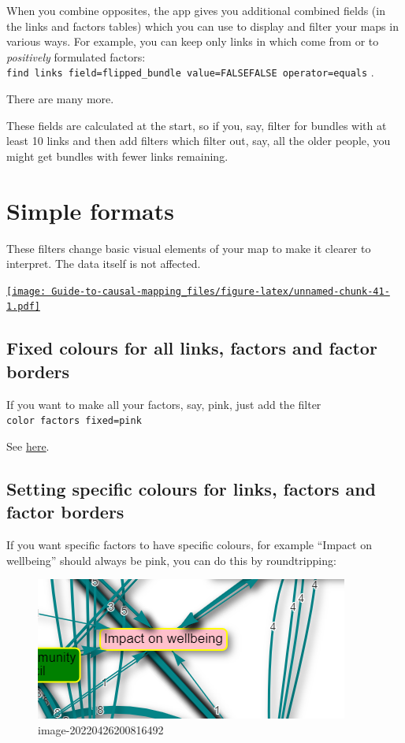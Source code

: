 \documentclass[
]{book}
\begin{document}
When you combine opposites, the app gives you additional combined fields (in the links and factors tables) which you can use to display and filter your maps in various ways. For example, you can keep only links in which come from or to \emph{positively} formulated factors: \texttt{find\ links\ field=flipped\_bundle\ value=FALSE\textbar{}FALSE\ operator=equals} .

There are many more.

These fields are calculated at the start, so if you, say, filter for bundles with at least 10 links and then add filters which filter out, say, all the older people, you might get bundles with fewer links remaining.

\hypertarget{xsimple-formats}{%
\chapter{Simple formats}\label{xsimple-formats}}

These filters change basic visual elements of your map to make it clearer to interpret. The data itself is not affected.

\href{https://player.vimeo.com/video/651173445}{\texttt{[image: Guide-to-causal-mapping\_files/figure-latex/unnamed-chunk-41-1.pdf]}}

\hypertarget{fixed-colours-for-all-links-factors-and-factor-borders}{%
\section{Fixed colours for all links, factors and factor borders}\label{fixed-colours-for-all-links-factors-and-factor-borders}}

If you want to make all your factors, say, pink, just add the filter \texttt{color\ factors\ fixed=pink}

See \protect\hyperlink{xfixed-colours}{here}.

\hypertarget{setting-specific-colours-for-links-factors-and-factor-borders}{%
\section{Setting specific colours for links, factors and factor borders}\label{setting-specific-colours-for-links-factors-and-factor-borders}}

If you want specific factors to have specific colours, for example ``Impact on wellbeing'' should always be pink, you can do this by roundtripping:

\begin{figure}
\centering
\includegraphics{_assets/image-20220426200816492.png}
\caption{image-20220426200816492}
\end{figure}
\end{document}
